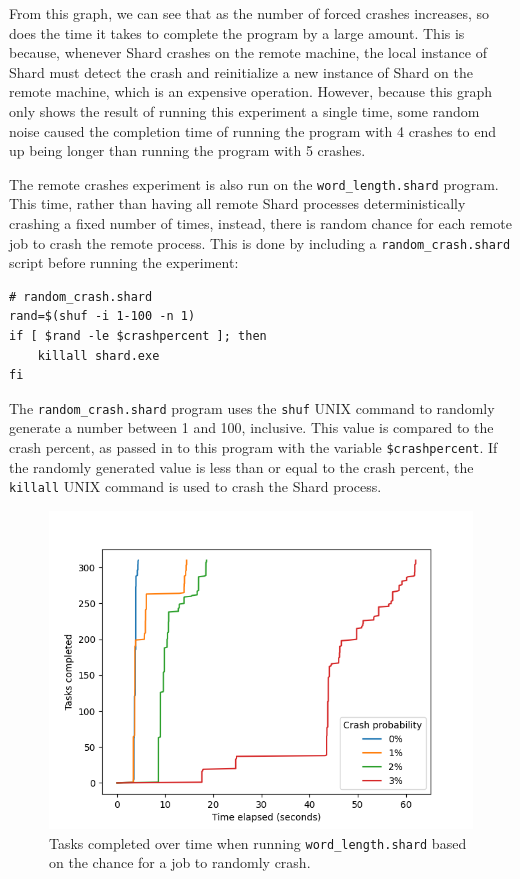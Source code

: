\documentclass[twoside]{report}
\begin{document}
From this graph, we can see that as the number of forced crashes increases, so does the time it takes to complete the program by a large amount.
This is because, whenever Shard crashes on the remote machine, the local instance of Shard must detect the crash and reinitialize a new instance of Shard on the remote machine, which is an expensive operation.
However, because this graph only shows the result of running this experiment a single time, some random noise caused the completion time of running the program with 4 crashes to end up being longer than running the program with 5 crashes.

The remote crashes experiment is also run on the \texttt{word\_length.shard} program.
This time, rather than having all remote Shard processes deterministically crashing a fixed number of times, instead, there is random chance for each remote job to crash the remote process.
This is done by including a \texttt{random\_crash.shard} script before running the experiment:

\begin{minipage}[c]{\textwidth-15pt}
  \begin{lstlisting}[language=Shard]
# random_crash.shard
rand=$(shuf -i 1-100 -n 1)
if [ $rand -le $crashpercent ]; then
    killall shard.exe
fi
\end{lstlisting}
  \smallskip
\end{minipage}

The \texttt{random\_crash.shard} program uses the \texttt{shuf} UNIX command to randomly generate a number between 1 and 100, inclusive.
This value is compared to the crash percent, as passed in to this program with the variable \texttt{\$crashpercent}.
If the randomly generated value is less than or equal to the crash percent, the \texttt{killall} UNIX command is used to crash the Shard process.

\begin{figure}[h]
  \begin{center}
    \includegraphics[scale=0.9]{img/experiments/e6_1620960581241.png}
    \caption{Tasks completed over time when running \texttt{word\_length.shard} based on the chance for a job to randomly crash.}
    \label{fig:crashwordlength}
  \end{center}
\end{figure}
\end{document}
